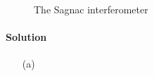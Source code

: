 \documentclass[hyperref, a4paper]{article}
\begin{document}
\begin{figure}
    \centering
    
    \caption{The Sagnac interferometer}
    \label{fig:sagnac-device}
\end{figure}

\paragraph{Solution} \begin{itemize}
    \item[(a)] 
\end{itemize}


 
\end{document}
